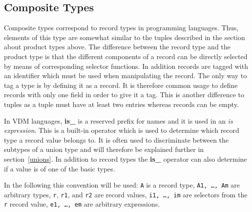 \documentclass{overturerepchap}
\newcommand{\keyw}[1]{{\bf\ttfamily #1}}
\begin{document}
\subsection{Composite Types}\label{records}

Composite types correspond to record types in programming languages.
Thus, elements of this type are somewhat similar to the tuples
described in the section about product types above. The difference
between the record type and the product type is that the different
components of a record can be directly selected by means of
corresponding selector functions. In addition records are tagged with
an identifier which must be used when manipulating the record. The
only way to tag a type is by defining it as a record. It is therefore
common usage to define records with only one field in order to give it
a tag. This is another difference to tuples as a tuple must have at
least two entries whereas records can be empty.

In VDM languages, \keyw{is\_} is a reserved prefix for names
and it is used in an {\it is expression}. This is a built-in operator
which is used to determine which record type a record value belongs to.
It is often used to discriminate between the subtypes of a union type
and will therefore be explained further in section~\ref{unions}. In
addition to record types the \keyw{is\_} operator can also determine if
a value is of one of the basic types.
 
In the following this convention will be used: {\tt A} is a record
type, {\tt A1, \ldots, Am} are arbitrary types, {\tt r}, {\tt r1}, and
{\tt r2} are record values, {\tt i1, \ldots, im} are selectors from
the {\tt r} record value, {\tt e1, \ldots, em} are arbitrary
expressions.
\end{document}
